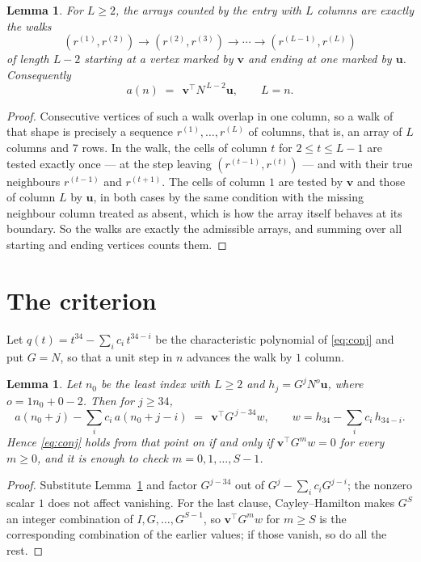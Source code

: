 \documentclass[11pt,a4paper]{article}
\theoremstyle{plain}
\newtheorem{lemma}[theorem]{Lemma}
\theoremstyle{definition}
\begin{document}
\begin{lemma}\label{lem:walk}
For $L\ge2$, the arrays counted by the entry with $L$ columns are exactly the walks
\[
(r^{(1)},r^{(2)})\to(r^{(2)},r^{(3)})\to\cdots\to(r^{(L-1)},r^{(L)})
\]
of length $L-2$ starting at a vertex marked by $\mathbf{v}$ and ending at one marked by
$\mathbf{u}$. Consequently
\[
a(n)\;=\;\,\mathbf{v}^{\!\top}N^{\,L-2}\mathbf{u},\qquad L=n .
\]
\end{lemma}

\begin{proof}
Consecutive vertices of such a walk overlap in one column, so a walk of that shape is
precisely a sequence $r^{(1)},\dots,r^{(L)}$ of columns, that is, an array of $L$ columns
and $7$ rows. In the walk, the cells of column $t$ for $2\le t\le L-1$ are tested
exactly once --- at the step leaving $(r^{(t-1)},r^{(t)})$ --- and with their true
neighbours $r^{(t-1)}$ and $r^{(t+1)}$. The cells of column $1$ are tested by
$\mathbf{v}$ and those of column $L$ by $\mathbf{u}$, in both cases by the same condition
with the missing neighbour column treated as absent, which is how the array itself behaves at
its boundary. So the walks are exactly the admissible arrays, and summing over all starting
and ending vertices counts them.
\end{proof}

\section{The criterion}

Let $q(t)=t^{34}-\sum_i c_i\,t^{34-i}$ be the characteristic polynomial of
\eqref{eq:conj} and put $G=N$, so that a unit step in $n$ advances the walk by
$1$ column.

\begin{lemma}\label{lem:crit}
Let $n_0$ be the least index with $L\ge2$ and $h_j=G^{j}N^{o}\mathbf{u}$, where
$o=1n_0+0-2$. Then for $j\ge34$,
\[
a(n_0+j)-\sum_i c_i\,a(n_0+j-i)\;=\;\,\mathbf{v}^{\!\top}G^{\,j-34}w,
\qquad w=h_{34}-\sum_i c_i\,h_{34-i} .
\]
Hence \eqref{eq:conj} holds from that point on if and only if
$\mathbf{v}^{\!\top}G^{m}w=0$ for every $m\ge0$, and it is enough to check
$m=0,1,\dots,S-1$.
\end{lemma}

\begin{proof}
Substitute Lemma~\ref{lem:walk} and factor $G^{j-34}$ out of
$G^{j}-\sum_ic_iG^{j-i}$; the nonzero scalar $1$ does not affect
vanishing. For the last clause, Cayley--Hamilton makes $G^{S}$ an integer combination of
$I,G,\dots,G^{S-1}$, so $\mathbf{v}^{\!\top}G^{m}w$ for $m\ge S$ is the corresponding
combination of the earlier values; if those vanish, so do all the rest.
\end{proof}
\end{document}
